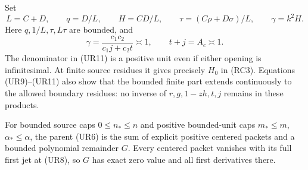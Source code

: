 Set
\[
 L=C+D,\qquad q=D/L,\qquad H=CD/L,\qquad
 \tau=(C\rho+D\sigma)/L,\qquad \gamma=k^2H.
\]
Here $q,1/L,\tau,L\tau$ are bounded, and
\[
 \gamma=\frac{c_1c_2}{c_1j+c_2t}\asymp1,
 \qquad t+j=A_c\asymp1.                              \tag{UR11}
 \label{pc3daa35e9a9b:eq:ui-harmonic-unit}
\]
The denominator in (UR11) is a positive unit even if either opening
is infinitesimal. At finite source residues it gives precisely $H_0$
in (RC3). Equations (UR9)--(UR11) also show that the bounded finite
part extends continuously to the allowed boundary residues: no
inverse of $r,g,1-zh,t,j$ remains in these products.

\begin{proposition}
\label{pc3daa35e9a9b:prop:ui-bounded-remainder}
For bounded source caps $0\le n_*\le n$ and positive bounded-unit
caps $m_*\le m$, $\alpha_*\le\alpha$, the parent (UR6) is the sum
of explicit positive centered packets and a bounded polynomial
remainder $G$. Every centered packet vanishes with its full first jet
at (UR8), so $G$ has exact zero value and all first derivatives there.
\end{proposition}

